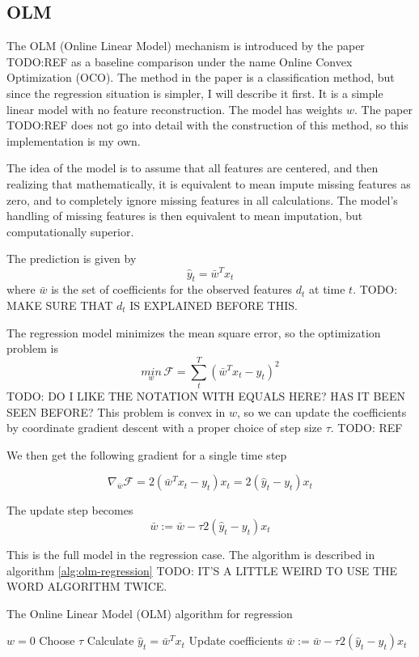 \subsection{OLM}
The OLM (Online Linear Model) mechanism is introduced by the paper TODO:REF as
a baseline comparison under the name Online Convex Optimization (OCO). The
method in the paper is a classification method, but since the regression
situation is simpler, I will describe it first.  It is a simple linear model
with no feature reconstruction. The model has weights $w$. The paper TODO:REF
does not go into detail with the construction of this method, so this
implementation is my own.

The idea of the model is to assume that all features are centered, and then
realizing that mathematically, it is equivalent to mean impute missing features
as zero, and to completely ignore missing features in all calculations. The
model's handling of missing features is then equivalent to mean imputation, but
computationally superior.

The prediction is given by
\begin{equation}
  \hat y_t = \bar w^T x_t
\end{equation}
where $\bar w$ is the set of coefficients for the observed features $d_t$ at
time $t$. TODO: MAKE SURE THAT $d_t$ IS EXPLAINED BEFORE THIS.

The regression model minimizes the mean square error, so the optimization problem is
\begin{equation}
  \underset{w}{min}\, \mathcal F = \sum_t^T (\bar w^T x_t - y_t)^2
\end{equation}
TODO: DO I LIKE THE NOTATION WITH EQUALS HERE? HAS IT BEEN SEEN BEFORE?
This problem is convex in $w$, so we can update the coefficients by coordinate
gradient descent with a proper choice of step size $\tau$. TODO: REF

We then get the following gradient for a single time step

\begin{equation}
  \nabla_{\bar w} \mathcal F = 2 (\bar w^T x_t - y_t) x_t = 2(\hat y_t - y_t) x_t
\end{equation}

The update step becomes
\begin{equation}
  \bar w := \bar w - \tau 2 (\hat y_t - y_t) x_t
\end{equation}

This is the full model in the regression case. The algorithm is described in
algorithm \ref{alg:olm-regression} TODO: IT'S A LITTLE WEIRD TO USE THE WORD
ALGORITHM TWICE.
\begin{algorithm}
  \caption{The Online Linear Model (OLM) algorithm for regression}\label{alg:olm-regression}
  \begin{algorithmic}
    \State $w=0$ 
    \State Choose $\tau$
      \State Calculate $\hat y_t = \bar w^T x_t$
      \State Update coefficients $\bar w := \bar w - \tau 2 (\hat y_t - y_t) x_t$
    \EndFor
  \end{algorithmic}
\end{algorithm}


